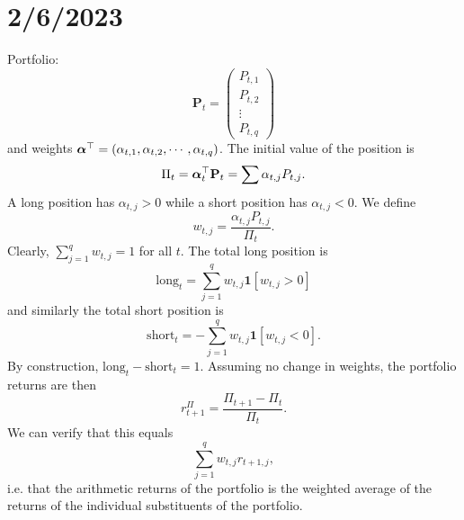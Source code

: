 \chapter{2/6/2023}
Portfolio: $$ \mathbf P_t=\begin{pmatrix} P_{t,1} \\ P_{t,2} \\ \vdots \\ P_{t,q} \end{pmatrix} $$ and weights $\boldsymbol{\alpha}^\top=(\alpha_{t,1},\alpha_{t,2},\cdots,\alpha_{t,q})$. The initial value of the position is $$ \Pi_t=\boldsymbol{\alpha}_t^\top \mathbf P_t=\sum \alpha_{t,j}P_{t,j}. $$ A long position has $\alpha_{t,j}>0$ while a short position has $\alpha_{t,j}<0$. We define $$ w_{t,j}=\frac{\alpha_{t,j}P_{t,j}}{\Pi_t}. $$ Clearly, $\sum_{j=1}^q w_{t,j}=1$ for all $t$. The total long position is $$ \text{long}_t = \sum_{j=1}^q w_{t,j}\mathbf 1[w_{t,j}>0] $$ and similarly the total short position is $$ \text{short}_t = -\sum_{j=1}^q w_{t,j}\mathbf 1[w_{t,j}<0]. $$ By construction, $\text{long}_t-\text{short}_t=1$. Assuming no change in weights, the portfolio returns are then $$ r_{t+1}^\Pi=\frac{\Pi_{t+1}-\Pi_t}{\Pi_t}. $$ We can verify that this equals $$ \sum_{j=1}^q w_{t,j} r_{t+1,j}, $$ i.e. that the arithmetic returns of the portfolio is the weighted average of the returns of the individual substituents of the portfolio.

